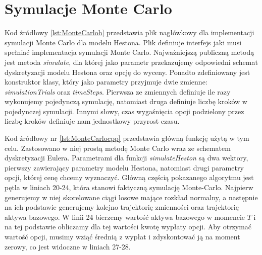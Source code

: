 \documentclass{pracamgr}
\begin{document}
\clearpage
\section{Symulacje Monte Carlo}
Kod źródłowy \ref{lst:MonteCarloh} przedstawia plik nagłówkowy dla implementacji symulacji 
Monte Carlo dla modelu Hestona. Plik definiuje interfejs jaki musi spełniać
implementacja symulacji Monte Carlo. Najważniejszą publiczną metodą jest metoda \textit{simulate}, 
dla której jako parametr przekazujemy odpowiedni schemat dyskretyzacji modelu Hestona 
oraz opcję do wyceny. 
Ponadto zdefiniowany jest konstruktor klasy, który jako parametry przyjmuje dwie zmienne:
\textit{simulationTrials} oraz \textit{timeSteps}.
Pierwsza ze zmiennych definiuje ile razy wykonujemy pojedynczą symulację, natomiast druga 
definiuje liczbę kroków w pojedynczej symulacji. Innymi słowy, czas wygaśnięcia opcji 
podzielony przez liczbę kroków definiuje nam jednostkowy przyrost czasu.
Kod źródłowy nr \ref{lst:MonteCarlocpp} przedstawia główną funkcję użytą w tym celu. 
Zastosowano w niej prostą metodę Monte Carlo wraz ze schematem dyskretyzacji Eulera. 
Parametrami dla funkcji \textit{simulateHeston} są dwa wektory, pierwszy zawierający
parametry modelu Hestona, natomiast drugi parametry opcji, której cenę chcemy wyznaczyć. 
Główną częścią pokazanego algorytmu jest pętla w liniach 20-24, która stanowi faktyczną symulację
Monte-Carlo. Najpierw generujemy w niej skorelowane ciągi losowe mające rozkład normalny, 
a następnie na ich podstawie generujemy kolejno trajektorię zmienności oraz trajektorię aktywa
bazowego. W linii 24 bierzemy wartość aktywa bazowego w momencie $T$ i na tej podstawie obliczamy dla
tej wartości kwotę wypłaty opcji. Aby otrzymać wartość opcji, musimy wziąć średnią z wypłat i
zdyskontować ją na moment zerowy, co jest widoczne w liniach 27-28.

\end{document}
